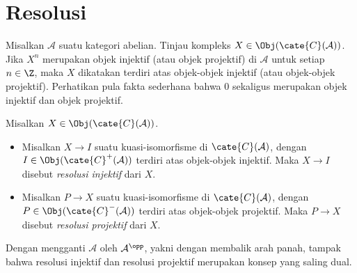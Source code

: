 
\section{Resolusi}\label{sec:resolutions}
\hypertarget{o014.aljabr2.chapter3.resolutions}{ }
Misalkan $\mathcal{A}$ suatu kategori abelian. Tinjau kompleks $X \in \Obj(\cate{C}(\mathcal{A}))$. Jika $X^n$ merupakan objek injektif (atau objek projektif) di $\mathcal{A}$ untuk setiap $n \in \Z$, maka $X$ dikatakan terdiri atas objek-objek injektif (atau objek-objek projektif). Perhatikan pula fakta sederhana bahwa $0$ sekaligus merupakan objek injektif dan objek projektif.

\begin{definisi}\label{def:resolutions}
	Misalkan $X \in \Obj(\cate{C}(\mathcal{A}))$.
	\begin{itemize}
		\item Misalkan $X \to I$ suatu kuasi-isomorfisme di $\cate{C}(\mathcal{A})$, dengan $I \in \Obj(\cate{C}^+(\mathcal{A}))$ terdiri atas objek-objek injektif. Maka $X \to I$ disebut \emph{resolusi injektif} dari $X$.
		\item Misalkan $P \to X$ suatu kuasi-isomorfisme di $\cate{C}(\mathcal{A})$, dengan $P \in \Obj(\cate{C}^-(\mathcal{A}))$ terdiri atas objek-objek projektif. Maka $P \to X$ disebut \emph{resolusi projektif} dari $X$.
	\end{itemize}
\end{definisi}

Dengan mengganti $\mathcal{A}$ oleh $\mathcal{A}^{\opp}$, yakni dengan membalik arah panah, tampak bahwa resolusi injektif dan resolusi projektif merupakan konsep yang saling dual.

